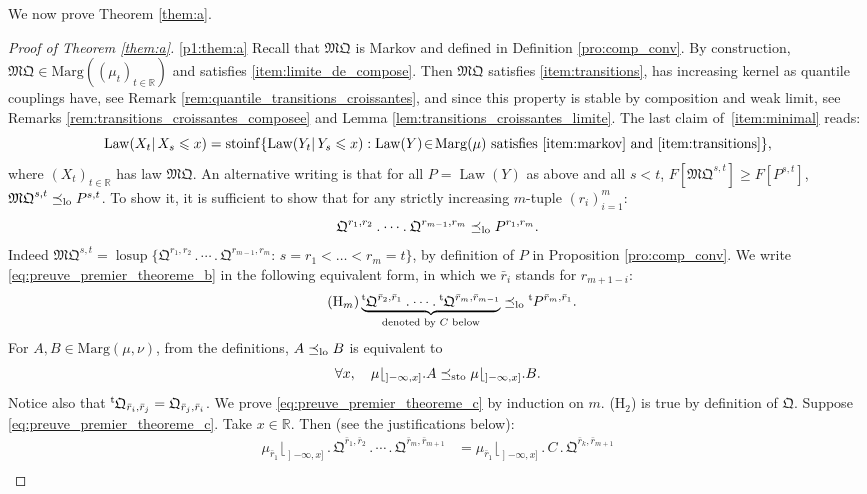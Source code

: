\documentclass[JEP,XML,SOM,Unicode,NoEqCountersInSection,NoFloatCountersInSection,published]{cedram}
\newcommand{\ldot}{\mathbin{.}}
\newcommand{\lcdots}{\ldot\cdots\ldot}
\theoremstyle{plain}
\theoremstyle{definition}
\newcommand{\como}{\mathfrak{Q}}
\newcommand{\mq}{\mathfrak{MQ}}
\newcommand{\trans}{{}^{\mathrm{t}}\mkern-1mu}
\newcommand{\ma}{\mathrm{Marg}}
\newcommand{\R}{\mathbb{R}}
\newcommand{\law}{\operatorname{Law}}
\newcommand{\lcsup}{\operatorname{losup}}
\newcommand{\leqs}{\preceq_{\text{\rm sto}}}
\newcommand{\op}{\mathopen}
\newcommand{\leqlc}{\preceq_{\rm lo}}
\begin{document}
We now prove Theorem \ref{them:a}.

\skpt
\begin{proof}[Proof of Theorem \ref{them:a}]

\eqref{p1:them:a}
Recall that $\mq$ is Markov and defined in Definition \ref{pro:comp_conv}. By construction, $\mq\in\ma((\mu_t)_{t\in\R})$ and satisfies \eqref{item:limite_de_compose}. Then $\mq$ satisfies \eqref{item:transitions}, \ie has increasing kernel as quantile couplings have, see Remark \ref{rem:quantile_transitions_croissantes}, and since this property is stable by composition and weak limit, see Remarks \ref{rem:transitions_croissantes_composee} and Lemma \ref{lem:transitions_croissantes_limite}. The last claim of~\eqref{item:minimal} reads:
\[
\law(X_{t}|\,X_{s}\leqslant x)
=\mathrm{stoinf}\{\law(Y_{t}|\,Y_{s}\leqslant x):\law(Y)\!\in\!\ma(\mu)\ \text{satisfies \eqref{item:markov} and \eqref{item:transitions}}\},
\]
where $(X_t)_{t\in \R}$ has law $\mq$. An alternative writing is that for all $P=\law(Y)$ as above and all $s<t$, $F[\mq^{s,t}]\geqslant F[P^{s,t}]$, \ie $\mq^{s,t}\leqlc P^{s,t}$. To show it, it is sufficient to show that for any strictly increasing $m$-tuple $(r_i)_{i=1}^m$:
\begin{equation}\label{eq:preuve_premier_theoreme_b}
\como^{r_1,r_2}\lcdots \como^{r_{m-1},r_m}\leqlc P^{r_1,r_m}.
\end{equation}
Indeed $\mq^{s,t}=\lcsup \{\como^{r_1,r_2}\lcdots \como^{r_{m-1},r_m}:\,s= r_1<\ldots<r_m= t\}$, by definition of $P$ in Proposition \ref{pro:comp_conv}.
We write \eqref{eq:preuve_premier_theoreme_b} in the following equivalent form, in which we $\bar r_i$ stands for $r_{m+1-i}$:
\begin{equation}\tag{H$_m$}\label{eq:preuve_premier_theoreme_c}
\underbrace{\trans\como^{\bar r_2,\bar r_1}\lcdots \trans\como^{\bar r_{m},\bar r_{m-1}}}_{\text{denoted by $C$ below}}\leqlc \trans P^{\bar r_m,\bar r_1}.
\end{equation}
For $A,B\in\ma(\mu,\nu)$, from the definitions, $A\leqlc B$ is equivalent to
\[
\forall x,\quad\mu\lfloor_{\op]-\infty,x]}\ldot A\leqs\mu\lfloor_{\op]-\infty,x]}\ldot B.
\]
Notice also that $\trans\como_{\bar r_i,\bar r_j}=\como_{\bar r_j,\bar r_i}$. We prove \eqref{eq:preuve_premier_theoreme_c} by induction on $m$. (H$_2$) is true by definition of $\como$. Suppose \eqref{eq:preuve_premier_theoreme_c}. Take $x\in\R$. Then (see the justifications below):
\begin{align}
\mu_{\bar r_1}\lfloor_{\op]-\infty,x]}{}\ldot\como^{\bar r_1,\bar r_2}\lcdots \como^{\bar r_{m},\bar r_{m+1}}&=\mu_{\bar r_1}\lfloor_{\op]-\infty,x]}\ldot C\ldot\como^{\bar r_{k},\bar r_{m+1}}\nonumber\\

\end{align}
\end{proof}
\end{document}
